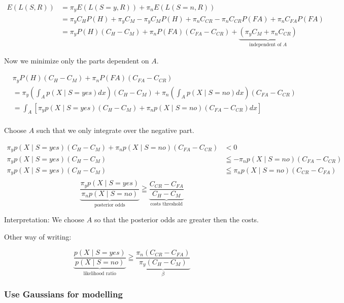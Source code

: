 \documentclass[../main/Notes.tex]{subfiles}
\begin{document}
\begin{align*}
E(L(S,R)) &= \pi_y  E(L(S=y, R)) + \pi_n E(L(S=n, R))\\
&= \pi_y C_H  P(H) + \pi_y C_M - \pi_y C_M P(H) + \pi_n C_{CR} - \pi_n C_{CR} P(FA) + \pi_n C_{FA} P(FA)\\
&= \pi_y P(H) (C_H - C_M) + \pi_n P(FA) (C_{FA} - C_{CR}) + \underbrace{(\pi_y C_M + \pi_n C_{CR})}_{\text{independent of } A} &
\end{align*}

Now we minimize only the parts dependent on $A$.

\begin{align*}
& \pi_y P(H) (C_H - C_M) + \pi_n P(FA) (C_{FA} - C_{CR})\\
&= \pi_y \left(\int_A p(X \mid S=yes) dx\right)(C_H - C_M) + \pi_n \left(\int_A p(X \mid S=no) dx\right) (C_{FA} - C_{CR})\\
&= \int_A \left[\pi_y p(X \mid S=yes)(C_H - C_M) + \pi_n p(X \mid S=no)(C_{FA} - C_{CR}) dx\right] & \\
\end{align*}

Choose $A$ such that we only integrate over the negative part.

\begin{align*}
\pi_y p(X \mid S=yes)(C_H - C_M) + \pi_n p(X \mid S=no)(C_{FA} - C_{CR}) &< 0 \\
\pi_y p(X \mid S=yes)(C_H - C_M) &\leqq - \pi_n p(X \mid S=no)(C_{FA} - C_{CR}) \\
\pi_y p(X \mid S=yes)(C_H - C_M) &\leqq \pi_n p(X \mid S=no)(C_{CR} - C_{FA}) \\
\end{align*}
\begin{equation*}
\underbrace{\frac{\pi_y p(X \mid S=yes)}{\pi_n p(X \mid S=no)}}_\text{posterior odds} \geqq \underbrace{\frac{C_{CR} - C_{FA}}{C_H - C_M}}_\text{costs threshold}
\end{equation*}

Interpretation: We choose $A$ so that the posterior odds are greater then the costs.

Other way of writing:

\begin{equation*}
\underbrace{\frac{p(X \mid S=yes)}{p(X \mid S=no)}}_\text{likelihood ratio} \geqq \underbrace{\frac{\pi_n(C_{CR} - C_{FA})}{\pi_y(C_H - C_M)}}_\beta
\end{equation*}


\subsubsection{Use Gaussians for modelling}
\end{document}
